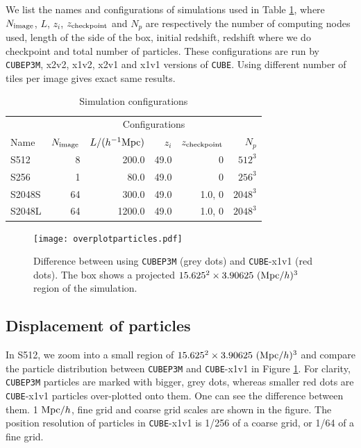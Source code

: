 \documentclass[10pt,twocolumn,preprint]{emulateapj}
\begin{document}
We list the names and configurations of simulations used in Table \ref{t.sim}, where $N_{\rm image}$, $L$, $z_i$, $z_{\rm checkpoint}$ and $N_p$ are respectively the number of computing nodes used, length of the side of the box, initial redshift, redshift where we do checkpoint and total number of particles. These configurations are run by {\tt CUBEP3M}, x2v2, x1v2, x2v1 and x1v1 versions of {\tt CUBE}. Using different number of tiles per image gives exact same results.

\begin{table}[]
\centering
\caption{Simulation configurations}
\label{t.sim}
\begin{tabular}{lrrrrr}
\hline
& \multicolumn{5}{c}{Configurations}\\
\cline{2-6}
Name  & $N_{\rm image}$ & $L/(h^{-1}{\rm Mpc})$ & $z_i$ & $z_{\rm checkpoint}$ & $N_p$ \\
\hline
S512   & 8     & 200.0   & 49.0 & 0      & $512^3$     \\
S256   & 1     & 80.0    & 49.0 & 0      & $256^3$     \\
S2048S & 64    & 300.0   & 49.0 & 1.0, 0  & $2048^3$     \\
S2048L & 64    & 1200.0  & 49.0 & 1.0, 0  & $2048^3$     \\
\hline
\end{tabular}
\end{table}

\begin{figure}[t]
\centering
  \texttt{[image: overplotparticles.pdf]}
 \caption{Difference between using {\tt CUBEP3M} (grey dots) and {\tt CUBE}-x1v1 (red dots). The box shows a projected $15.625^2\times 3.90625\ ({\rm Mpc}/h)^3$ region of the simulation. }
\label{fig.particles}
\end{figure}

\subsection{Displacement of particles}
In S512, we zoom into a small region of $15.625^2\times 3.90625\ ({\rm Mpc}/h)^3$ and compare the particle distribution between {\tt CUBEP3M} and {\tt CUBE}-x1v1 in Figure \ref{fig.particles}. For clarity, {\tt CUBEP3M} particles are marked with bigger, grey dots, whereas smaller red dots are {\tt CUBE}-x1v1 particles over-plotted onto them. One can see the difference between them. 1 ${\rm Mpc}/h$, fine grid and coarse grid scales are shown in the figure. The position resolution of particles in {\tt CUBE}-x1v1 is 1/256 of a coarse grid, or 1/64 of a fine grid.
\end{document}
